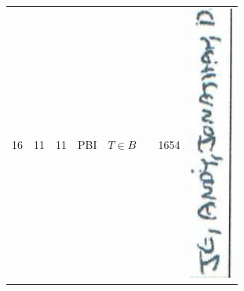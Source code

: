 \documentclass[10pt]{article}
\begin{document}
\begin{center}
\begin{tabular}{|c|c|c|c|c|c|c|c|}
16 & 11 & 11 & PBI & \(T \in B\) &  & 1654 & \includegraphics[max width=\textwidth]{2025_02_27_dd68c3d38de88f0516d9g-038}

\end{tabular}
\end{center}
\end{document}
